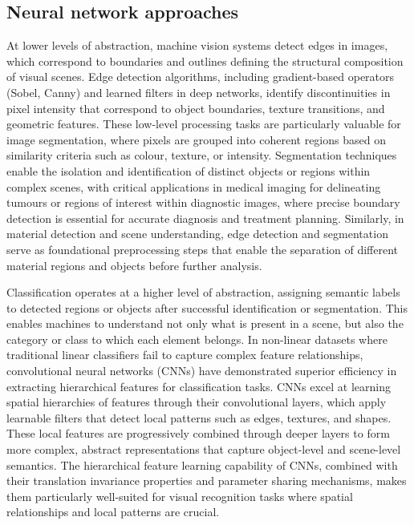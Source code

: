 \documentclass[12pt,a4paper,oneside]{report}
\begin{document}
\subsection{Neural network approaches}
\label{subsec:neural_network_approaches}

At lower levels of abstraction, machine vision systems detect edges in images, which correspond to boundaries and outlines defining the structural composition of visual scenes. Edge detection algorithms, including gradient-based operators (Sobel, Canny) and learned filters in deep networks, identify discontinuities in pixel intensity that correspond to object boundaries, texture transitions, and geometric features. These low-level processing tasks are particularly valuable for image segmentation, where pixels are grouped into coherent regions based on similarity criteria such as colour, texture, or intensity. Segmentation techniques enable the isolation and identification of distinct objects or regions within complex scenes, with critical applications in medical imaging for delineating tumours or regions of interest within diagnostic images, where precise boundary detection is essential for accurate diagnosis and treatment planning. Similarly, in material detection and scene understanding, edge detection and segmentation serve as foundational preprocessing steps that enable the separation of different material regions and objects before further analysis.

Classification operates at a higher level of abstraction, assigning semantic labels to detected regions or objects after successful identification or segmentation. This enables machines to understand not only what is present in a scene, but also the category or class to which each element belongs. In non-linear datasets where traditional linear classifiers fail to capture complex feature relationships, convolutional neural networks (CNNs) \cite{lecun1998,lecun1989} have demonstrated superior efficiency in extracting hierarchical features for classification tasks. CNNs excel at learning spatial hierarchies of features through their convolutional layers, which apply learnable filters that detect local patterns such as edges, textures, and shapes. These local features are progressively combined through deeper layers to form more complex, abstract representations that capture object-level and scene-level semantics. The hierarchical feature learning capability of CNNs, combined with their translation invariance properties and parameter sharing mechanisms, makes them particularly well-suited for visual recognition tasks where spatial relationships and local patterns are crucial.
\end{document}
